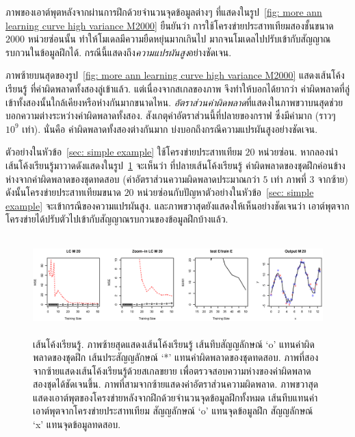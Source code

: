 ภาพของเอาต์พุตหลังจากผ่านการฝึกด้วยจำนวนจุดข้อมูลต่างๆ ที่แสดงในรูป~\ref{fig: more ann learning curve high variance M2000} ยืนยันว่า การใช้โครงข่ายประสาทเทียมสองชั้นขนาด $2000$ หน่วยซ่อนนั้น 
ทำให้โมเดลมีความยืดหยุ่นมากเกินไป มากจนโมเดลไปปรับเข้ากับสัญญาณรบกวนในข้อมูลฝึกได้.
กรณีนี้แสดงถึง\textit{ความแปรผันสูง}อย่างชัดเจน.

ภาพซ้ายบนสุดของรูป~\ref{fig: more ann learning curve high variance M2000} แสดงเส้นโค้งเรียนรู้ ที่ค่าผิดพลาดทั้งสองลู่เข้าแล้ว.
แต่เนื่องจากสเกลของภาพ จึงทำให้บอกได้ยากว่า ค่าผิดพลาดที่ลู่เข้าทั้งสองนั้นใกล้เคียงหรือห่างกันมากขนาดไหน.
\textit{อัตราส่วนค่าผิดพลาด}ที่แสดงในภาพขวาบนสุดช่วยบอกความต่างระหว่างค่าผิดพลาดทั้งสอง.
สังเกตุค่าอัตราส่วนนี้ที่ปลายของกราฟ ซึ่งมีค่ามาก (ราวๆ $10^9$ เท่า). %
นั่นคือ ค่าผิดพลาดทั้งสองต่างกันมาก บ่งบอกถึงกรณีความแปรผันสูงอย่างชัดเจน.
%

ตัวอย่างในหัวข้อ~\ref{sec: simple example} ใช้โครงข่ายประสาทเทียม $20$ หน่วยซ่อน.
หากลองนำเส้นโค้งเรียนรู้มาวาดดังแสดงในรูป~\ref{fig: ANN more learning curves example M20}
จะเห็นว่า ที่ปลายเส้นโค้งเรียนรู้ ค่าผิดพลาดของชุดฝึกค่อนข้างห่างจากค่าผิดพลาดของชุดทดสอบ (ค่าอัตราส่วนความผิดพลาดประมาณกว่า $5$ เท่า ภาพที่ 3 จากซ้าย)
ดังนั้นโครงข่ายประสาทเทียมขนาด $20$ หน่วยซ่อนกับปัญหาตัวอย่างในหัวข้อ~\ref{sec: simple example} จะเข้ากรณีของความแปรผันสูง.
และภาพขวาสุดยังแสดงให้เห็นอย่างชัดเจนว่า เอาต์พุตจากโครงข่ายได้ปรับตัวไปเข้ากับสัญญาณรบกวนของข้อมูลฝึกบ้างแล้ว.

%
\begin{figure}
\begin{center}
\includegraphics[height=1.5in]{04ANNlearncurve/LCM20.eps}
\end{center}
\caption{เส้นโค้งเรียนรู้.
ภาพซ้ายสุดแสดงเส้นโค้งเรียนรู้
เส้นทึบสัญญลักษณ์ `o' แทนค่าผิดพลาดของชุดฝึก
เส้นประสัญญลักษณ์ `*' แทนค่าผิดพลาดของชุดทดสอบ.
ภาพที่สองจากซ้ายแสดงเส้นโค้งเรียนรู้ด้วยสเกลขยาย 
เพื่อตรวจสอบความห่างของค่าผิดพลาดสองชุดได้ชัดเจนขึ้น.
ภาพที่สามจากซ้ายแสดงค่าอัตราส่วนความผิดพลาด.
ภาพขวาสุดแสดงเอาต์พุตของโครงข่ายหลังจากฝึกด้วยจำนวนจุดข้อมูลฝึกทั้งหมด
เส้นทึบแทนค่าเอาต์พุตจากโครงข่ายประสาทเทียม
สัญญลักษณ์ `o' แทนจุดข้อมูลฝึก
สัญญลักษณ์ `x' แทนจุดข้อมูลทดสอบ.}
\label{fig: ANN more learning curves example M20}
\end{figure}


